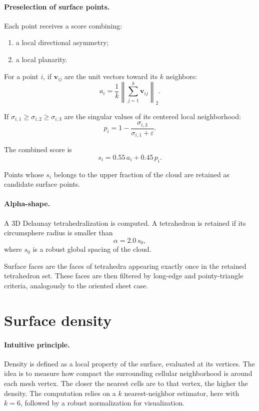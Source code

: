 \documentclass[11pt,a4paper]{article}
\begin{document}
\paragraph{Preselection of surface points.}
Each point receives a score combining:
\begin{enumerate}[label=\arabic*.]
  \item a local directional asymmetry;
  \item a local planarity.
\end{enumerate}

For a point $i$, if $\mathbf{v}_{ij}$ are the unit vectors toward its $k$ neighbors:
\[
a_i=\frac{1}{k}\left\|
\sum_{j=1}^{k}\mathbf{v}_{ij}
\right\|_2.
\]

If $\sigma_{i,1}\ge \sigma_{i,2}\ge \sigma_{i,3}$ are the singular values of its centered local neighborhood:
\[
p_i=
1-\frac{\sigma_{i,3}}{\sigma_{i,1}+\varepsilon}.
\]

The combined score is
\[
s_i=0.55\,a_i+0.45\,p_i.
\]

Points whose $s_i$ belongs to the upper fraction of the cloud are retained as candidate surface points.

\paragraph{Alpha-shape.}
A 3D Delaunay tetrahedralization is computed. A tetrahedron is retained if its circumsphere radius is smaller than
\[
\alpha = 2.0\,s_0,
\]
where $s_0$ is a robust global spacing of the cloud.

Surface faces are the faces of tetrahedra appearing exactly once in the retained tetrahedron set. These faces are then filtered by long-edge and pointy-triangle criteria, analogously to the oriented sheet case.

\section{Surface density}

\paragraph{Intuitive principle.}
Density is defined as a local property of the surface, evaluated at its vertices. The idea is to measure how compact the surrounding cellular neighborhood is around each mesh vertex. The closer the nearest cells are to that vertex, the higher the density. The computation relies on a $k$ nearest-neighbor estimator, here with $k=6$, followed by a robust normalization for visualization.
\end{document}
